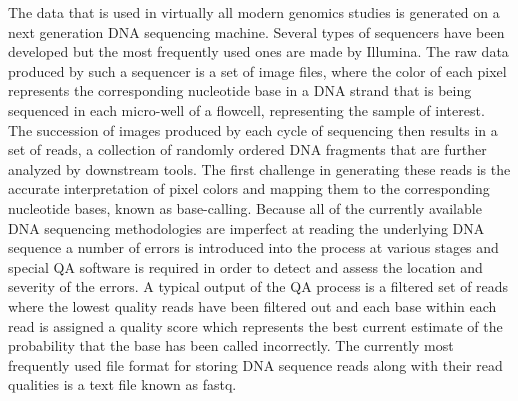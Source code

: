The data that is used in virtually all modern genomics studies is generated on a next generation DNA sequencing machine. Several types of sequencers have been developed but the most frequently used ones are made by Illumina. The raw data produced by such a sequencer is a set of image files, where the color of each pixel represents the corresponding nucleotide base in a DNA strand that is being sequenced in each micro-well of a flowcell, representing the sample of interest. The succession of images produced by each cycle of sequencing then results in a set of reads, a collection of randomly ordered DNA fragments that are further analyzed by downstream tools. The first challenge in generating these reads is the accurate interpretation of pixel colors and mapping them to the corresponding nucleotide bases, known as base-calling. Because all of the currently available DNA sequencing methodologies are imperfect at reading the underlying DNA sequence a number of errors is introduced into the process at various stages and special QA software is required in order to detect and assess the location and severity of the errors. A typical output of the QA process is a filtered set of reads where the lowest quality reads have been filtered out and each base within each read is assigned a quality score which represents the best current estimate of the probability that the base has been called incorrectly. The currently most frequently used file format for storing DNA sequence reads along with their read qualities is a text file known as fastq.

